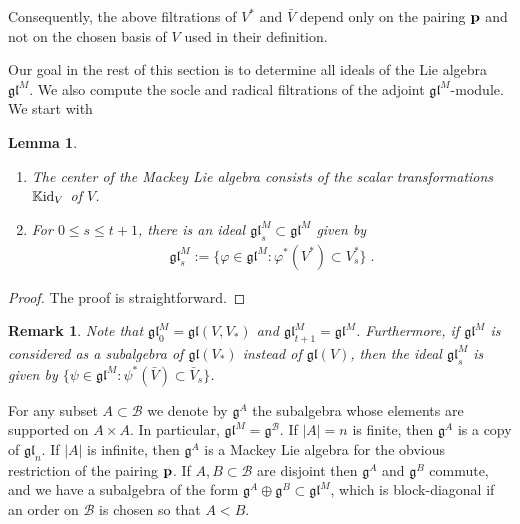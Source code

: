 \documentclass[12pt]{article}
\def\KK {{\mathbb K}}     %
\def\B  {\mathcal B}
\def\mk {\mathfrak}
\newtheorem{lemma}[theorem]{Lemma}
\newtheorem{rem}{Remark}[section]
\begin{document}
Consequently, the above filtrations of $V^*$ and $\bar V$ depend only on the pairing ${\bf p}$ and not on the chosen basis of $V$ used in their definition.

Our goal in the rest of this section is to determine all ideals of the Lie algebra $\mk{gl}^M$. We also compute the socle and radical filtrations of the adjoint $\mk{gl}^M$-module. We start with

\begin{lemma}\label{Lemma Center and glMs ideals}
\begin{enumerate}
\item[{\rm (i)}] The center of the Mackey Lie algebra consists of the scalar transformations $\KK{\rm id}_V$ of $V$.
\item[{\rm (ii)}] For $0\leq s\leq t+1$, there is an ideal $\mk{gl}_{s}^M\subset\mk{gl}^M$ given by
\begin{gather*}
\mk{gl}_{s}^M := \{\varphi\in\mk{gl}^M:\varphi^*(V^*)\subset V^*_{s}\} \;.
\end{gather*}
\end{enumerate}
\end{lemma}

\begin{proof}
The proof is straightforward.
\end{proof}

\begin{rem}
Note that $\mk{gl}^M_0=\mk{gl}(V,V_*)$ and $\mk{gl}^M_{t+1}=\mk{gl}^M$. Furthermore, if $\mk{gl}^M$ is considered as a subalgebra of $\mk{gl}(V_*)$ instead of $\mk{gl}(V)$, then the ideal $\mk{gl}^M_s$ is given by $\{\psi\in\mk{gl}^M:\psi^*(\bar V)\subset \bar V_{s}\}$.
\end{rem}

For any subset $A\subset\B$ we denote by $\mk g^A$ the subalgebra whose elements are supported on $A\times A$. In particular, $\mk{gl}^M=\mk g^\B$. If $|A|=n$ is finite, then $\mk g^A$ is a copy of $\mk{gl}_n$. If $|A|$ is infinite, then $\mk g^A$ is a Mackey Lie algebra for the obvious restriction of the pairing ${\bf p}$. If $A,B\subset \B$ are disjoint then $\mk g^A$ and $\mk g^B$ commute, and we have a subalgebra of the form $\mk g^A\oplus\mk g^B\subset\mk{gl}^M$, which is block-diagonal if an order on $\B$ is chosen so that $A<B$.
\end{document}
